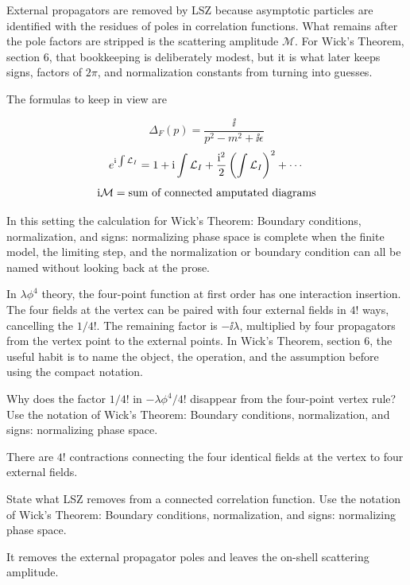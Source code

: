 External propagators are removed by LSZ because asymptotic particles are identified with the residues of poles in correlation functions.  What remains after the pole factors are stripped is the scattering amplitude \(\mathcal M\).  For Wick's Theorem, section 6, that bookkeeping is deliberately modest, but it is what later keeps signs, factors of \(2\pi\), and normalization constants from turning into guesses.

The formulas to keep in view are

\[
  \Delta_F(p)=\frac{\ii}{p^2-m^2+\ii\epsilon}
\]
\[
  e^{\mathrm i\int\mathcal L_I}=1+\mathrm i\int\mathcal L_I+\frac{\mathrm i^2}{2}\left(\int\mathcal L_I\right)^2+\cdots
\]
\[
  \mathrm i\mathcal M=\hbox{sum of connected amputated diagrams}
\]

In this setting the calculation for Wick's Theorem: Boundary conditions, normalization, and signs: normalizing phase space is complete when the finite model, the limiting step, and the normalization or boundary condition can all be named without looking back at the prose.




\begin{example}
In \(\lambda\phi^4\) theory, the four-point function at first order has one interaction insertion.  The four fields at the vertex can be paired with four external fields in \(4!\) ways, cancelling the \(1/4!\).  The remaining factor is \(-\ii\lambda\), multiplied by four propagators from the vertex point to the external points.  In Wick's Theorem, section 6, the useful habit is to name the object, the operation, and the assumption before using the compact notation.
\end{example}



\begin{exercise}
Why does the factor \(1/4!\) in \(-\lambda\phi^4/4!\) disappear from the four-point vertex rule?  Use the notation of Wick's Theorem: Boundary conditions, normalization, and signs: normalizing phase space.
\begin{answer}
There are \(4!\) contractions connecting the four identical fields at the vertex to four external fields.
\end{answer}
\end{exercise}

\begin{exercise}
State what LSZ removes from a connected correlation function.  Use the notation of Wick's Theorem: Boundary conditions, normalization, and signs: normalizing phase space.
\begin{answer}
It removes the external propagator poles and leaves the on-shell scattering amplitude.
\end{answer}
\end{exercise}



